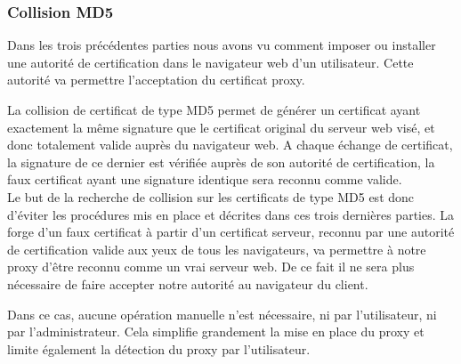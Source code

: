\subsubsection{Collision MD5}
Dans les trois précédentes parties nous avons vu comment imposer ou installer une 
autorité de certification dans le navigateur web d'un utilisateur. Cette 
autorité va permettre l'acceptation du certificat proxy.

La collision de certificat de type MD5 permet de générer un certificat ayant 
exactement la même signature que le certificat original du serveur web visé, et 
donc totalement valide auprès du navigateur web. A chaque échange de certificat, 
la signature de ce dernier est vérifiée auprès de son autorité de certification, 
la faux certificat ayant une signature identique sera reconnu comme valide.
~~\\

Le but de la recherche de collision sur les certificats de type MD5 est donc d'éviter les
procédures mis en place et décrites dans ces trois dernières parties. La forge d'un faux 
certificat à partir d'un certificat serveur, reconnu par une autorité de 
certification valide aux yeux de tous les navigateurs, va permettre à notre 
proxy d'être reconnu comme un vrai serveur web. De ce fait il ne sera plus 
nécessaire de faire accepter notre autorité au navigateur du client.

Dans ce cas, aucune opération manuelle n'est nécessaire, ni par l'utilisateur, ni par l'administrateur.
Cela simplifie grandement la mise en place du proxy et limite également la
détection du proxy par l'utilisateur.

